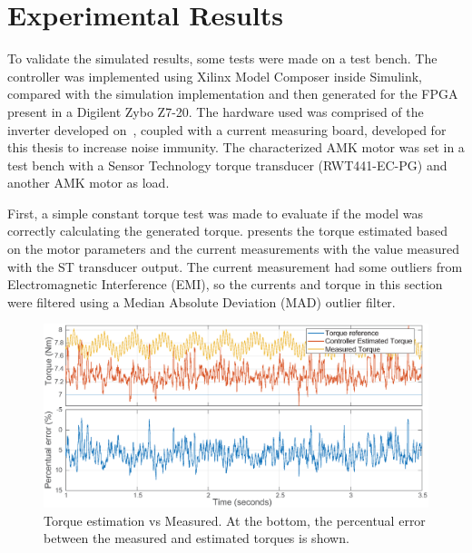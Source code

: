 \documentclass[9pt,conference]{IEEEtran}
\begin{document}
\patchcmd{\subfigmatrix}{\hspace{0.2cm}}{\hfill}{}{}

\section{Experimental Results}
\label{section:simulation}%

To validate the simulated results, some tests were made on a test bench. The controller was implemented using Xilinx Model Composer inside Simulink, compared with the simulation implementation and then generated for the FPGA present in a Digilent Zybo Z7-20. The hardware used was comprised of the inverter developed on~\cite{Costa:MSc}, coupled with a current measuring board, developed for this thesis to increase noise immunity. The characterized AMK motor was set in a test bench with a Sensor Technology torque transducer (RWT441-EC-PG) and another AMK motor as load.

First, a simple constant torque test was made to evaluate if the model was correctly calculating the generated torque.  presents the torque estimated based on the motor parameters and the current measurements with the value measured with the ST transducer output. The current measurement had some outliers from Electromagnetic Interference (EMI), so the currents and torque in this section were filtered using a Median Absolute Deviation (MAD) outlier filter.

\begin{figure}[!htb]
	\centering
	\includegraphics[width=1\linewidth]{Figures/constantTq.eps}
	\caption[Torque estimation vs Measured. In the bottom the percentual error between the measured and estimated torques is shown.]{Torque estimation vs Measured. At the bottom, the percentual error between the measured and estimated torques is shown.}
	\label{fig:constant_tq} %
\end{figure}
\end{document}
